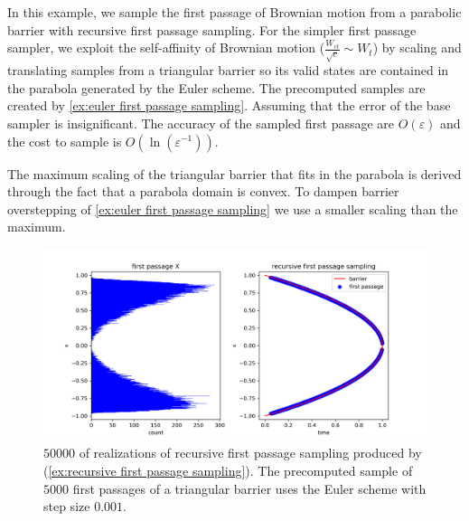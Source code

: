 \documentclass[a4paper,12pt]{article}
\begin{document}
\begin{example} \label{ex:recursive first passage sampling}
  In this example, we sample the first passage of Brownian motion from a parabolic barrier
  with recursive first passage sampling.
  For the simpler first passage sampler, we  exploit the self-affinity of Brownian motion
  ($\frac{W_{ct}}{\sqrt{c}} \sim W_{t}$)
  by scaling and translating
  samples from a triangular barrier so its
  valid states are contained in the parabola generated
  by the Euler scheme. The precomputed samples are created
  by \ref{ex:euler first passage sampling}.
  Assuming that the error of the base sampler is insignificant.
  The accuracy of the sampled first passage
  are $O(\varepsilon)$ and the cost to sample is $O(\ln \left(\varepsilon^{-1}\right))$.

  The maximum scaling of the triangular barrier that fits
  in the parabola is derived through the fact that a parabola domain is convex.
  To dampen barrier
  overstepping of \ref{ex:euler first passage sampling} we use a smaller scaling
  than the maximum.

  \begin{figure}[h!]
    \centering
    \includegraphics[width=1\textwidth]{plots/recursive first passage para.png}
    \caption{ $50000$ of realizations of recursive first passage sampling produced
      by (\ref{ex:recursive first passage sampling}). The precomputed sample of $5000$ first
      passages of a triangular barrier uses the Euler scheme with
      step size $0.001$.}
    \label{fig:recursive first passage para}
  \end{figure}

\end{example}

\end{document}
